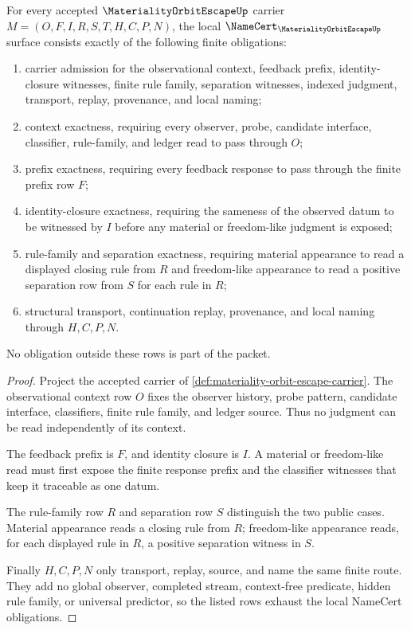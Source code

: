 \begin{theorem}\label{thm:materiality-orbit-escape-namecert-obligations}
For every accepted $\MaterialityOrbitEscapeUp$ carrier $M=(O,F,I,R,S,T,H,C,P,N)$, the local $\NameCert_{\MaterialityOrbitEscapeUp}$ surface consists exactly of the following finite obligations:
\begin{enumerate}
\item carrier admission for the observational context, feedback prefix, identity-closure witnesses, finite rule family, separation witnesses, indexed judgment, transport, replay, provenance, and local naming;
\item context exactness, requiring every observer, probe, candidate interface, classifier, rule-family, and ledger read to pass through $O$;
\item prefix exactness, requiring every feedback response to pass through the finite prefix row $F$;
\item identity-closure exactness, requiring the sameness of the observed datum to be witnessed by $I$ before any material or freedom-like judgment is exposed;
\item rule-family and separation exactness, requiring material appearance to read a displayed closing rule from $R$ and freedom-like appearance to read a positive separation row from $S$ for each rule in $R$;
\item structural transport, continuation replay, provenance, and local naming through $H,C,P,N$.
\end{enumerate}
No obligation outside these rows is part of the packet.
\end{theorem}
\begin{proof}
Project the accepted carrier of \autoref{def:materiality-orbit-escape-carrier}. The observational context row $O$ fixes the observer history, probe pattern, candidate interface, classifiers, finite rule family, and ledger source. Thus no judgment can be read independently of its context.

The feedback prefix is $F$, and identity closure is $I$. A material or freedom-like read must first expose the finite response prefix and the classifier witnesses that keep it traceable as one datum.

The rule-family row $R$ and separation row $S$ distinguish the two public cases. Material appearance reads a closing rule from $R$; freedom-like appearance reads, for each displayed rule in $R$, a positive separation witness in $S$.

Finally $H,C,P,N$ only transport, replay, source, and name the same finite route. They add no global observer, completed stream, context-free predicate, hidden rule family, or universal predictor, so the listed rows exhaust the local NameCert obligations.
\end{proof}

